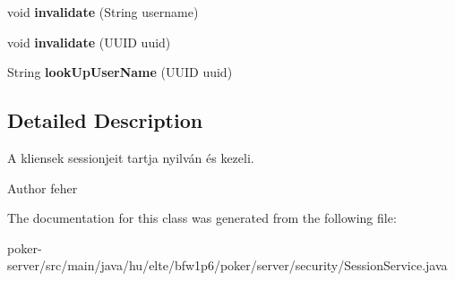 \begin{DoxyCompactItemize}
\item 
\hypertarget{classhu_1_1elte_1_1bfw1p6_1_1poker_1_1server_1_1security_1_1_session_service_a0f1c5a330c2073330cf43e8f148b3787}{}void {\bfseries invalidate} (String username)\label{classhu_1_1elte_1_1bfw1p6_1_1poker_1_1server_1_1security_1_1_session_service_a0f1c5a330c2073330cf43e8f148b3787}

\item 
\hypertarget{classhu_1_1elte_1_1bfw1p6_1_1poker_1_1server_1_1security_1_1_session_service_afe8b57374bc7e5ca9679216e7c8a708e}{}void {\bfseries invalidate} (U\+U\+I\+D uuid)\label{classhu_1_1elte_1_1bfw1p6_1_1poker_1_1server_1_1security_1_1_session_service_afe8b57374bc7e5ca9679216e7c8a708e}

\item 
\hypertarget{classhu_1_1elte_1_1bfw1p6_1_1poker_1_1server_1_1security_1_1_session_service_acf3b226f7582c2298b5ea2138b0d4678}{}String {\bfseries look\+Up\+User\+Name} (U\+U\+I\+D uuid)\label{classhu_1_1elte_1_1bfw1p6_1_1poker_1_1server_1_1security_1_1_session_service_acf3b226f7582c2298b5ea2138b0d4678}

\end{DoxyCompactItemize}


\subsection{Detailed Description}
A kliensek sessionjeit tartja nyilván és kezeli. \begin{DoxyAuthor}{Author}
feher 
\end{DoxyAuthor}


The documentation for this class was generated from the following file\+:\begin{DoxyCompactItemize}
\item 
poker-\/server/src/main/java/hu/elte/bfw1p6/poker/server/security/Session\+Service.\+java\end{DoxyCompactItemize}
